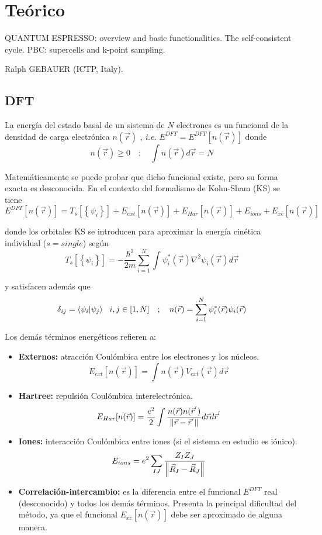 \section{Teórico}

   QUANTUM ESPRESSO: overview and basic functionalities. The self-consistent cycle. PBC: supercells and k-point sampling.

   Ralph GEBAUER (ICTP, Italy).

\subsection{DFT}

  La energía del estado basal de un sistema de $N$ electrones es un funcional de la densidad de carga electrónica $n(\vec{r})$ , \emph{i.e.} $E^{DFT} = E^{DFT} [n(\vec{r})]$ donde
    $$n(\vec{r}) \geq 0 \quad ; \quad \int n(\vec{r}) d\vec{r} = N$$

  Matemáticamente se puede probar que dicho funcional existe, pero su forma exacta es desconocida. En el contexto del formalismo de Kohn-Sham (KS) se tiene
    $$E^{DFT} [n(\vec{r})] = T_s [\left\{ \psi_i \right\}] + E_{ext} [n(\vec{r})] + E_{Har} [n(\vec{r})] + E_{ions} + E_{xc} [n(\vec{r})]$$

  donde los orbitales KS se introducen para aproximar la energía cinética individual ($s = single$) según
    $$T_s [\left\{ \psi_i \right\}] = -\frac{\hbar^2}{2m} \sum_{i=1}^N \int \psi_i^{*} (\vec{r}) \nabla^2 \psi_i (\vec{r}) d\vec{r}$$

  y satisfacen además que
    $$\delta_{ij} = \braket{\psi_i}{\psi_j}\ \ i,j\in[1,N] \quad ; \quad n(\vec{r}) = \sum_{i=1}^N \psi_i^{*} (\vec{r}) \psi_i (\vec{r})$$


  Los demás términos energéticos refieren a:
    \begin{itemize}
      \item \textbf{Externos:} atracción Coulómbica entre los electrones y los núcleos.
        $$E_{ext} [n(\vec{r})] = \int n(\vec{r}) V_{ext} (\vec{r}) d\vec{r}$$
      \item \textbf{Hartree:} repulsión Coulómbica interelectrónica.
        $$E_{Har} [n(\vec{r})] = \frac{e^2}{2} \int \frac{n(\vec{r}) n(\vec{r}^{'})}{\norm{\vec{r} - \vec{r}^{'}}} d\vec{r} d\vec{r}^{'}$$
      \item \textbf{Iones:} interacción Coulómbica entre iones (si el sistema en estudio es iónico).
        $$E_{ions} = e^2 \sum_{IJ} \frac{Z_I Z_J}{\norm{\vec{R}_I - \vec{R}_J }}$$
      \item \textbf{Correlación-intercambio:} es la diferencia entre el funcional $E^{DFT}$ real (desconocido) y todos los demás términos. Presenta la principal dificultad del método, ya que el funcional $E_{xc} [n(\vec{r})]$ debe ser aproximado de alguna manera.
    \end{itemize}

